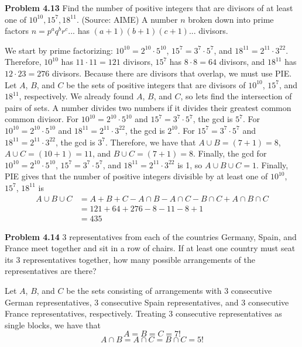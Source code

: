 \documentclass[11pt]{scrartcl}
\begin{document}
\begin{tcolorbox}
\textbf{Problem 4.13} Find the number of positive integers that are divisors of at least one of $10^{10},15^7,18^{11}$. (Source: AIME) A number $n$ broken down into prime factors $n=p^aq^br^c...$ has $(a+1)(b+1)(c+1)...$ divisors. 
\end{tcolorbox}
\noindent 
We start by prime factorizing: $10^{10}=2^{10} \cdot 5^{10}$, $15^7=3^7 \cdot 5^7$, and $18^{11}=2^{11} \cdot 3^{22}$. Therefore, $10^{10}$ has $11 \cdot 11=121$ divisors, $15^7$ has $8 \cdot 8=64$ divisors, and $18^{11}$ has $12 \cdot 23=276$ divisors. Because there are divisors that overlap, we must use PIE. Let $A$, $B$, and $C$ be the sets of positive integers that are divisors of $10^{10}$, $15^7$, and $18^{11}$, respectively. We already found $A$, $B$, and $C$, so lets find the intersection of pairs of sets. A number divides two numbers if it divides their greatest common common divisor. For $10^10=2^{10} \cdot 5^{10}$ and $15^7=3^7 \cdot 5^7$, the gcd is $5^7$. For $10^10=2^{10} \cdot 5^{10}$ and $18^{11}=2^{11} \cdot 3^{22}$, the gcd is $2^10$. For $15^7=3^7 \cdot 5^7$ and $18^{11}=2^{11} \cdot 3^{22}$, the gcd is $3^7$. Therefore, we have that ${A \cup B}=(7+1)=8$, ${A \cup C}=(10+1)=11$, and ${B \cup C}=(7+1)=8$. Finally, the gcd for $10^{10}=2^{10} \cdot 5^{10}$, $15^7=3^7 \cdot 5^7$, and $18^{11}=2^{11} \cdot 3^{22}$ is 1, so ${A \cup B \cup C}=1$. Finally, PIE gives that the number of positive integers divisible by at least one of $10^{10}$, $15^7$, $18^{11}$ is 
\begin{align*}
    {A \cup B \cup C} &=A+B+C-{A \cap B}-{A \cap C}-{B \cap C}+{A \cap B \cap C} \\
                      &=121+64+276-8-11-8+1 \\
                      &=435
\end{align*}
\begin{tcolorbox}
\textbf{Problem 4.14} 3 representatives from each of the countries Germany, Spain, and France meet together and sit in a row of chairs. If at least one country must seat its 3 representatives together, how many possible arrangements of the representatives are there?
\end{tcolorbox}
\noindent
Let $A$, $B$, and $C$ be the sets consisting of arrangements with 3 consecutive German representatives, 3 consecutive Spain representatives, and 3 consecutive France representatives, respectively. Treating 3 consecutive representatives as single blocks, we have that 
$$A=B=C=7!$$
$${A \cap B}={A \cap C}={B \cap C}=5!$$
\end{document}
